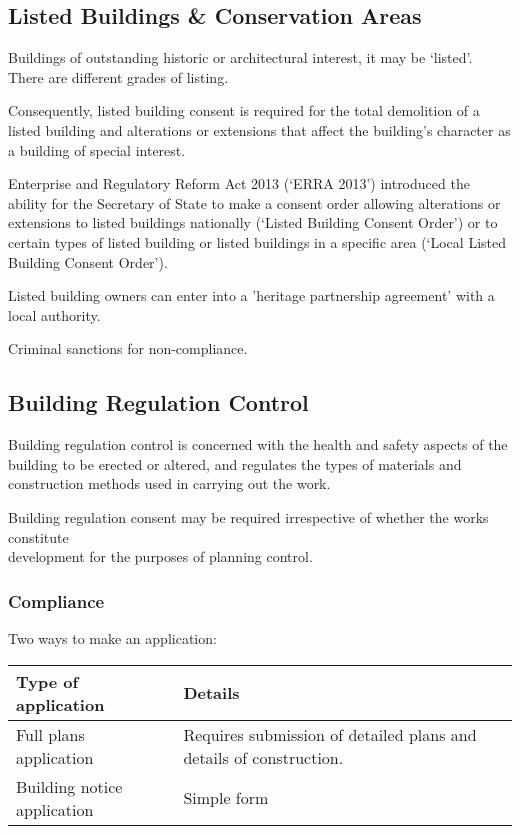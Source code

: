 \documentclass[
]{article}
\begin{document}
\hypertarget{listed-buildings-conservation-areas}{%
\subsection{Listed Buildings \& Conservation
Areas}\label{listed-buildings-conservation-areas}}

Buildings of outstanding historic or architectural interest, it may be
`listed'. There are different grades of listing.

Consequently, listed building consent is required for the total
demolition of a listed building and alterations or extensions that
affect the building's character as a building of special interest.

Enterprise and Regulatory Reform Act 2013 (`ERRA 2013') introduced the
ability for the Secretary of State to make a consent order allowing
alterations or extensions to listed buildings nationally (`Listed
Building Consent Order') or to certain types of listed building or
listed buildings in a specific area (`Local Listed Building Consent
Order').

Listed building owners can enter into a 'heritage partnership agreement'
with a local authority.

Criminal sanctions for non-compliance.

\hypertarget{building-regulation-control}{%
\subsection{Building Regulation
Control}\label{building-regulation-control}}

Building regulation control is concerned with the health and safety
aspects of the building to be erected or altered, and regulates the
types of materials and construction methods used in carrying out the
work.

Building regulation consent may be required irrespective of whether the
works constitute\\
development for the purposes of planning control.

\hypertarget{compliance}{%
\subsubsection{Compliance}\label{compliance}}

Two ways to make an application:

\begin{longtable}[]{@{}ll@{}}
\toprule()
Type of application & Details \\
\midrule()
\endhead
Full plans application & Requires submission of detailed plans and
details of construction. \\
Building notice application & Simple form \\
\bottomrule()
\end{longtable}
\end{document}
